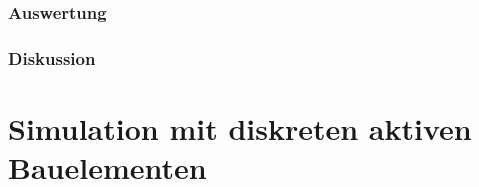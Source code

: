 \documentclass[12pt,a4paper]{article}
\begin{document}
\subsubsection{Auswertung}
\subsubsection{Diskussion}


\section{Simulation mit diskreten aktiven Bauelementen}
\end{document}
